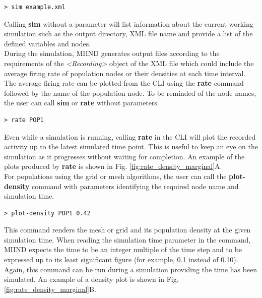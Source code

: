 \documentclass[utf8]{frontiersSCNS} %
\begin{document}
\begin{lstlisting}[language=xml,caption={Load a simulation file in the CLI.}]
> sim example.xml
\end{lstlisting}

Calling \textbf{sim} without a parameter will list information about the current working simulation such as the output directory, XML file name and provide a list of the defined variables and nodes.\\

During the simulation, MIIND generates output files according to the requirements of the \textit{\textless Recording\textgreater} object of the XML file which could include the average firing rate of population nodes or their densities at each time interval. The average firing rate can be plotted from the CLI using the \textbf{rate} command followed by the name of the population node. To be reminded of the node names, the user can call \textbf{sim} or \textbf{rate} without parameters.\\

\begin{lstlisting}[language=xml,caption={Plot the rate of population POP1 in the CLI.}]
> rate POP1
\end{lstlisting}

Even while a simulation is running, calling \textbf{rate} in the CLI will plot the recorded activity up to the latest simulated time point. This is useful to keep an eye on the simulation as it progresses without waiting for completion. An example of the plots produced by \textbf{rate} is shown in Fig. \ref{fig:rate_density_marginal}A.\\
For populations using the grid or mesh algorithms, the user can call the \textbf{plot-density} command with parameters identifying the required node name and simulation time. \\

\begin{lstlisting}[language=xml,caption={Plot the probability density of population POP1 at time 0.42s in the CLI.}]
> plot-density POP1 0.42
\end{lstlisting}

This command renders the mesh or grid and its population density at the given simulation time. When reading the simulation time parameter in the command, MIIND expects the time to be an integer multiple of the time step and to be expressed up to its least significant figure (for example, 0.1 instead of 0.10). Again, this command can be run during a simulation providing the time has been simulated. An example of a density plot is shown in Fig. \ref{fig:rate_density_marginal}B.\\
\end{document}

